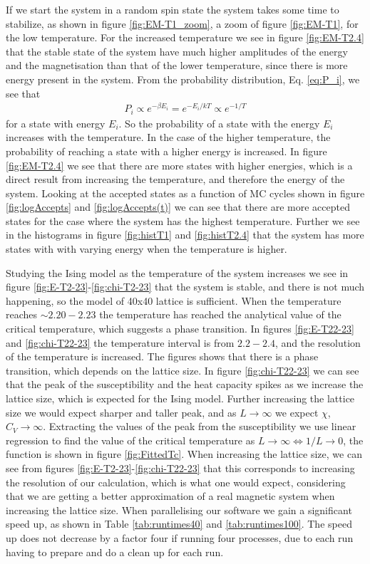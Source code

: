 \documentclass{emulateapj}
\begin{document}
 If we start the system in a random spin state the system takes some time to stabilize, as shown in figure \ref{fig:EM-T1_zoom}, a zoom of figure \ref{fig:EM-T1}, for the low temperature. For the increased temperature we see in figure \ref{fig:EM-T2.4} that the stable state of the system have much higher amplitudes of the energy and the magnetisation than that of the lower temperature, since there is more energy present in the system. 
 From the probability distribution, Eq. \eqref{eq:P_i}, we see that 
 \begin{align*}
 P_i \propto e^{-\beta E_i} = e^{-E_i/kT} \propto e^{-1/T}
 \end{align*}
 for a state with energy $E_i$. So the probability of a state with the energy $E_i$ increases with the temperature. In the case of the higher temperature, the probability of reaching a state with a higher energy is increased. In figure \ref{fig:EM-T2.4} we see that there are more states with higher energies, which is a direct result from increasing the temperature, and therefore the energy of the system. Looking at the accepted states as a function of MC cycles shown in figure \ref{fig:logAccepts} and \ref{fig:logAccepts(t)} we can see that there are more accepted states for the case where the system has the highest temperature. Further we see in the histograms in figure \ref{fig:histT1} and \ref{fig:histT2.4} that the system has more states with with varying energy when the temperature is higher.
 
Studying the Ising model as the temperature of the system increases we see in figure \ref{fig:E-T2-23}-\ref{fig:chi-T2-23} that the system is stable, and there is not much happening, so the model of 40x40 lattice is sufficient. When the temperature reaches $\sim 2.20-2.23$ the temperature has reached the analytical value of the critical temperature, which suggests a phase transition. In figures \ref{fig:E-T22-23} and \ref{fig:chi-T22-23} the temperature interval is from $2.2-2.4$, and the resolution of the temperature is increased. The figures shows that there is a phase transition, which depends on the lattice size. In figure \ref{fig:chi-T22-23} we can see that the peak of the susceptibility and the heat capacity spikes as we increase the lattice size, which is expected for the Ising model. Further increasing the lattice size we would expect sharper and taller peak, and as $L\rightarrow \infty$ we expect $\chi$, $C_V \rightarrow \infty$. Extracting the values of the peak from the susceptibility we use linear regression to find the value of the critical temperature as $L\rightarrow \infty \Longleftrightarrow 1/L \rightarrow 0$, the function is shown in figure \ref{fig:FittedTc}.
When increasing the lattice size, we can see from figures \ref{fig:E-T2-23}-\ref{fig:chi-T22-23} that this corresponds to increasing the resolution of our calculation, which is what one would expect, considering that we are getting a better approximation of a real magnetic system when increasing the lattice size. 
When parallelising our software we gain a significant speed up, as shown in Table \ref{tab:runtimes40} and \ref{tab:runtimes100}. The speed up does not decrease by a factor four if running four processes, due to each run having to prepare and do a clean up for each run. 
\end{document}
